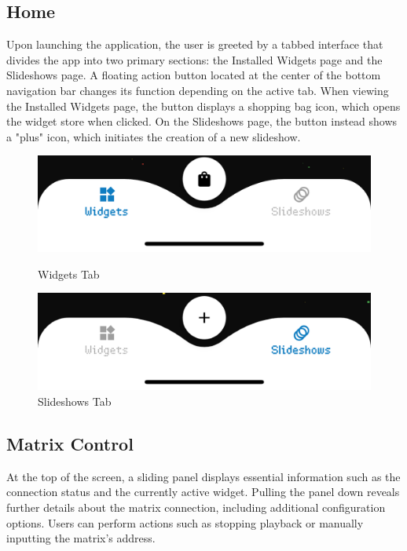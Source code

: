 \subsection{Home}
Upon launching the application, the user is greeted by a tabbed interface that divides the app into two primary sections: the Installed Widgets page and the Slideshows page. A floating action button located at the center of the bottom navigation bar changes its function depending on the active tab. When viewing the Installed Widgets page, the button displays a shopping bag icon, which opens the widget store when clicked. On the Slideshows page, the button instead shows a "plus" icon, which initiates the creation of a new slideshow.

\begin{figure}[h]
    \centering
    \begin{minipage}[b]{0.45\textwidth}
        \centering
        \includegraphics[width=\textwidth]{tesi/img/tab_bar/tab-bar-widgets.png}
        \caption*{Widgets Tab}
    \end{minipage}
    \begin{minipage}[b]{0.45\textwidth}
        \centering
        \includegraphics[width=\textwidth]{tesi/img/tab_bar/tab-bar-slideshows.png}
        \caption*{Slideshows Tab}
    \end{minipage}
\end{figure}

\subsection{Matrix Control}
At the top of the screen, a sliding panel displays essential information such as the connection status and the currently active widget. Pulling the panel down reveals further details about the matrix connection, including additional configuration options. Users can perform actions such as stopping playback or manually inputting the matrix's address.


